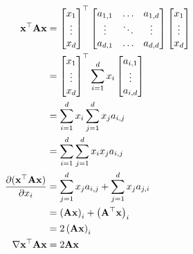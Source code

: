 \documentclass[assignment01_Solutions]{subfiles}
\begin{document}
\begin{exercise}[30 minutes]
\begin{boxedsolution}
\begin{align}
\mathbf{x}^\top \mathbf{A} \mathbf{x} &= \begin{bmatrix} x_1 \\ \vdots \\ x_d \end{bmatrix}^\top \begin{bmatrix} a_{1,1} & \ldots &  a_{1,d} \\
\vdots &  \ddots &  \vdots \\
a_{d,1} & \ldots & a_{d,d}
\end{bmatrix} \begin{bmatrix}x_1 \\ \vdots \\ x_d \end{bmatrix} \\
&= \begin{bmatrix} x_1 \\ \vdots \\ x_d \end{bmatrix}^\top\sum_{i=1}^d x_i \begin{bmatrix} a_{i, 1} \\ \vdots \\ a_{i,d} \end{bmatrix} \\
&= \sum_{i=1}^d x_i \sum_{j=1}^d x_j  a_{i, j} \\
&= \sum_{i=1}^d\sum_{j=1}^d   x_i  x_j  a_{i, j} \\
\frac{\partial (\mathbf{x}^\top \mathbf{A} \mathbf{x})}{\partial x_i} &= \sum_{j=1}^d x_j a_{i,j} + \sum_{j=1}^d x_j a_{j, i} \\
&= \left ( \mathbf{A} \mathbf{x} \right)_i + \left ( \mathbf{A}^\top \mathbf{x} \right)_i \\
&= 2\left ( \mathbf{A} \mathbf{x} \right)_i \\
\nabla \mathbf{x}^\top \mathbf{A} \mathbf{x} &= 2 \mathbf{A}\mathbf{x}
\end{align}

\end{boxedsolution}

\fi

\end{exercise}
\end{document}

